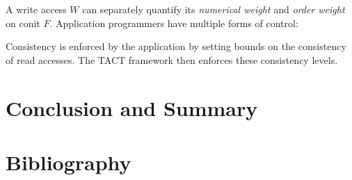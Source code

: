 \documentclass[]             %
{NASA}                       %
\theoremstyle{definition}
\begin{document}
A write access \(W\) can separately quantify its \emph{numerical weight}
and \emph{order weight} on conit \(F\). Application programmers have
multiple forms of control:

Consistency is enforced by the application by setting bounds on the
consistency of read accesses. The TACT framework then enforces these
consistency levels.


\section{Conclusion and Summary}
\label{sec:conclusion}



\section*{Bibliography}\label{bibliography}



\end{document}
